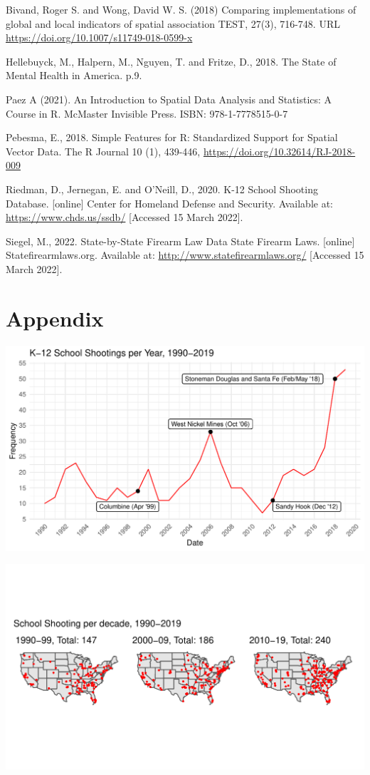 \documentclass[
  12pt,
]{article}
\begin{document}
Bivand, Roger S. and Wong, David W. S. (2018) Comparing implementations
of global and local indicators of spatial association TEST, 27(3),
716-748. URL \url{https://doi.org/10.1007/s11749-018-0599-x}

Hellebuyck, M., Halpern, M., Nguyen, T. and Fritze, D., 2018. The State
of Mental Health in America. p.9.

Paez A (2021). An Introduction to Spatial Data Analysis and Statistics:
A Course in R. McMaster Invisible Press. ISBN: 978-1-7778515-0-7

Pebesma, E., 2018. Simple Features for R: Standardized Support for
Spatial Vector Data. The R Journal 10 (1), 439-446,
\url{https://doi.org/10.32614/RJ-2018-009}

Riedman, D., Jernegan, E. and O'Neill, D., 2020. K-12 School Shooting
Database. {[}online{]} Center for Homeland Defense and Security.
Available at: \url{https://www.chds.us/ssdb/} {[}Accessed 15 March
2022{]}.

Siegel, M., 2022. State-by-State Firearm Law Data \textbar{} State
Firearm Laws. {[}online{]} Statefirearmlaws.org. Available at:
\url{http://www.statefirearmlaws.org/} {[}Accessed 15 March 2022{]}.

\newpage

\hypertarget{appendix}{%
\section{Appendix}\label{appendix}}

\includegraphics{JStevenRaquel_STATS295_Final_files/figure-latex/ts-plot-1990-2019-1.pdf}

\includegraphics{JStevenRaquel_STATS295_Final_files/figure-latex/plot-point-patterns-1.pdf}
\end{document}
